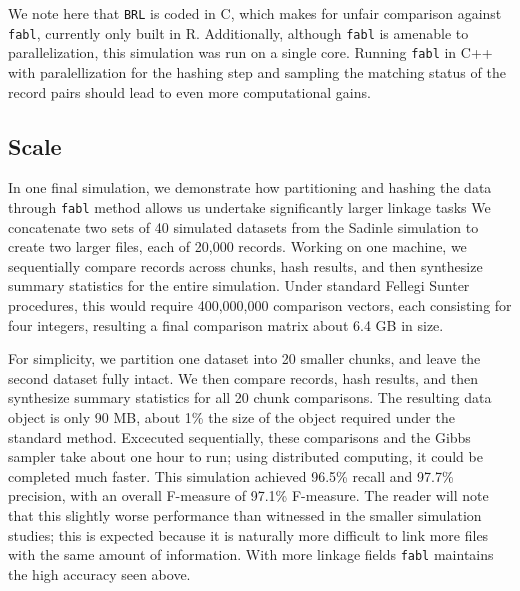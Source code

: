 \documentclass[12pt,letterpaper]{article}
\newcommand{\1}[1]{\mathbb{I}\!\left[#1\right]} %
\begin{document}
We note here that \texttt{BRL} is coded in C, which makes for unfair
comparison against \texttt{fabl}, currently only built in R.
Additionally, although \texttt{fabl} is amenable to parallelization,
this simulation was run on a single core. Running \texttt{fabl} in C++
with paralellization for the hashing step and sampling the matching
status of the record pairs should lead to even more computational gains.

\hypertarget{scale}{%
	\subsection{Scale}\label{scale}}

 
 In one final simulation, we demonstrate how partitioning and hashing the data through \texttt{fabl} method allows us undertake significantly larger linkage tasks We concatenate two sets of 40 simulated datasets from the Sadinle simulation to create two larger files, each of 20,000 records. Working on one machine, we sequentially compare records across chunks, hash results, and then synthesize summary statistics for the entire simulation. Under standard Fellegi Sunter procedures, this would require 400,000,000 comparison vectors, each consisting for four integers, resulting a final comparison matrix about 6.4 GB in size. 
 
 For simplicity, we partition one dataset into 20 smaller chunks, and leave the second dataset fully intact. We then compare records, hash results, and then synthesize summary statistics for all 20 chunk comparisons. The resulting data object is only 90 MB, about 1\% the size of the object required under the standard method. Excecuted sequentially, these comparisons and the Gibbs sampler take about one hour to run; using distributed computing, it could be completed much faster. This simulation achieved 96.5\% recall and 97.7\% precision, with an overall F-measure of 97.1\% F-measure. The reader will note that this slightly worse performance than witnessed in the smaller simulation studies; this is expected because it is naturally more difficult to link more files with the same amount of information. With more linkage fields \texttt{fabl} maintains the high accuracy seen above. 
 
\end{document}

